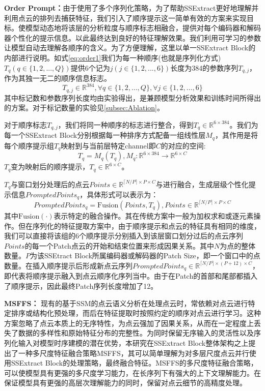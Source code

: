 \documentclass[preprint,12pt]{elsarticle}
\begin{document}
\textbf{Order Prompt：}由于使用了多个序列化策略，为了帮助SSExtract更好地理解并利用点云的排列去捕获特征，我们引入了顺序提示这一简单有效的方案来实现目标。使模型动态地将该层的分析粒度与顺序标志相融合，提供对每个编码器和解码器个性化的提示信息。以此最终达到良好的特征理解效果。我们利用可学习的参数让模型自动去理解各顺序的含义。为了方便理解，这里以单一SSExtract Block的内部进行说明。如式\cref{eq:order1}我们为每一种顺序(也就是序列化方式)$T_q(q\in\{1,2,...,Q\})$提供6个记为$j(j\in\{1,2,...,6\})$长度为384的参数序列$T_{{q,j}}$，作为其独一无二的顺序信息标志。
\begin{equation}\label{eq:order1}
	T_{q,j}\in\mathbb{R}^{384},\forall q\in\{1,2,\ldots,Q\},\forall j\in\{1,2,\ldots,6\}
	\end{equation}
其中标记数和参数序列长度均由实验得出，是兼顾模型分析效果和训练时间所得出的方案。对于标记数量的实验见\cref{subsec:Ablation}。

对于顺序标志$T_{{q,j}}$，我们将同一种顺序的标志进行整合，得到$T_{q} \in \mathbb{R}^{6\times 384}$。我们为每一个SSExtract Block分别根据每一种排序方式配备一组线性层$M_q $，其作用是将每个顺序提示组$T_{{q}}$映射到与当前层特定channel即$C$的对应的空间:
\begin{equation}T_{{q}}=M_q\left(T_{{q}}\right),M_q{:}\mathbb{R}^{6\times 384}\to\mathbb{R}^{6 \times C}\end{equation}
$T_{q}$变为映射后的顺序提示，$T_{q} \in \mathbb{R}^{6\times C}$。

$T_{q}$与窗口划分处理后的点云$Points \in\mathbb{R}^{\lceil N/P \rceil\times P \times C}$与进行融合，生成层级个性化提示信息$PromptedPoints_q$，具体形式可以表示为：
\begin{equation}
	PromptedPoints_q=\mathrm{Fusion}\left(Points,T_{{q}}\right),
	Points\in\mathbb{R}^{\lceil N/P \rceil\times P \times C}
\end{equation}
其中$\mathrm{Fusion}(\cdot)$表示特定的融合操作。其在传统方案中一般为加权求和或逐元素操作。但在序列化的特征提取方案中，由于顺序提示和点云的特征具有相同的维度，我们可以直接将该组的6个顺序提示分别插入到该层窗口划分过后的点云序列$Points$的每一个Patch点云的开始和结束位置来形成因果关系。其中$N$为点的整体数量。$P$为该SSEtract Block所属编码器或解码器的Patch Size，即一个窗口中的点数量。在插入顺序提示后形成新点云序列$PromptedPoints_q\in\mathbb{R}^{\lceil N/P \rceil\times (P+12) \times C}$，即代表将顺序提示融入到点云顺序化序列当中。由于在Patch的首部和尾部都插入了顺序提示，因此最终Patch序列长度增加了12。

\textbf{MSFFS：}
现有的基于SSM的点云语义分析在处理点云时，常依赖对点云进行特定排序或结构化预处理，而后在特征提取时按照约定的顺序对点云进行学习。这种方案忽略了点云本质上的无序特性，为点云强加了因果关系，从而在一定程度上丢失了数据的多样性和原始特征分布的完整性。为同时保留无序输入的灵活性以及序列化输入对模型时序建模的潜在优势，本研究在SSExtract Block整体架构之上提出了一种多尺度特征融合策略MSFFS，其可以简单理解为对多层尺度点云并行使用SSExtract Block的处理策略，最终融合特征。MSFFS的多尺度特征融合策略，可以使模型具有更强的多尺度学习能力，在长序列下有强大的上下文理解能力。在保证模型具有更强的高层次理解能力的同时，保留对点云细节的高精度处理。
\end{document}
